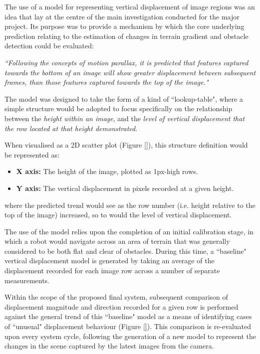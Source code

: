 The use of a model for representing vertical displacement of image regions was an idea that lay at the centre of the main investigation conducted for the major project. Its purpose was to provide a mechanism by which the core underlying prediction relating to the estimation of changes in terrain gradient and obstacle detection could be evaluated:
	
	\indent \textit{``Following the concepts of motion parallax, it is predicted that features captured towards the bottom of an image will show greater displacement between subsequent frames, than those features captured towards the top of the image."}
	
The model was designed to take the form of a kind of ``lookup-table", where a simple structure would be adopted to focus specifically on the relationship between the \textit{height within an image}, and the \textit{level of vertical displacement that the row located at that height demonstrated}. 
 
 When visualised as a 2D scatter plot (Figure \ref{}), this structure definition would be represented as:
	
	\begin{itemize}
		\item \textbf{X axis:} The height of the image, plotted as 1px-high rows.
		\item \textbf{Y axis:} The vertical displacement in pixels recorded at a given height.
	\end{itemize}
	
	where the predicted trend would see as the row number (i.e. height relative to the top of the image) increased, so to would the level of vertical displacement.
	
The use of the model relies upon the completion of an initial calibration stage, in which a robot would navigate across an area of terrain that was generally considered to be both flat and clear of obstacles. During this time, a ``baseline" vertical displacement model is generated by taking an average of the displacement recorded for each image row across a number of separate measurements.
	
Within the scope of the proposed final system, subsequent comparison of displacement magnitude and direction recorded for a given row is performed against the general trend of this ``baseline" model as a means of identifying cases of ``unusual" displacement behaviour (Figure \ref{}). This comparison is re-evaluated upon every system cycle, following the generation of a new model to represent the changes in the scene captured by the latest images from the camera. 

